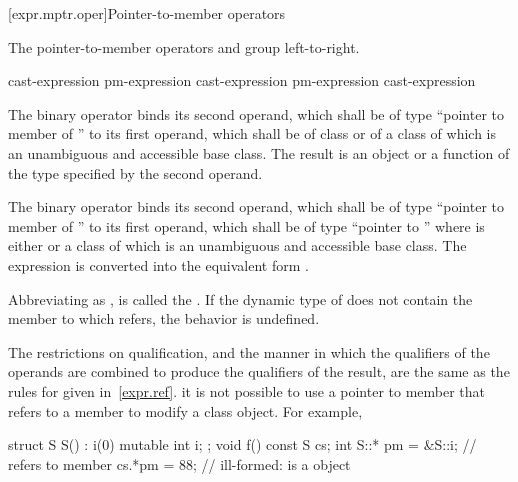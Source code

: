 [expr.mptr.oper]{Pointer-to-member operators}

\pnum
{}%
%
%
%
%
%
The pointer-to-member operators \tcode{->*} and  group
left-to-right.

\begin{bnf}
\br
    cast-expression\br
    pm-expression  cast-expression\br
    pm-expression \terminal{->*} cast-expression
\end{bnf}

\pnum
The binary operator  binds its second operand, which shall be
of type ``pointer to member of '' to its first operand, which shall be of
class  or of a class of which  is an unambiguous and
accessible base class. The result is an object or a function of the type
specified by the second operand.

\pnum
The binary operator \tcode{->*} binds its second operand, which shall be
of type ``pointer to member of '' to its first operand, which shall be of
type ``pointer to ''
where  is either  or
a class of which 
is an unambiguous and accessible base class.
The expression  is converted into the equivalent form
.

\pnum
Abbreviating  as , 
is called the .
If the dynamic type of  does not
contain the member to which
 refers, the behavior is undefined.

\pnum
The restrictions on qualification, and the manner in which
the qualifiers of the operands are combined to produce the
qualifiers of the result, are the same as the rules for
 given in~\ref{expr.ref}.
\enternote 
it is not possible to use a pointer to member that refers to a
 member to modify a  class object. For
example,

\begin{codeblock}
struct S {
  S() : i(0) { }
  mutable int i;
};
void f()
{
const S cs;
int S::* pm = &S::i;            //  refers to  member 
cs.*pm = 88;                    // ill-formed:  is a  object
}
\end{codeblock}
\exitnote 

